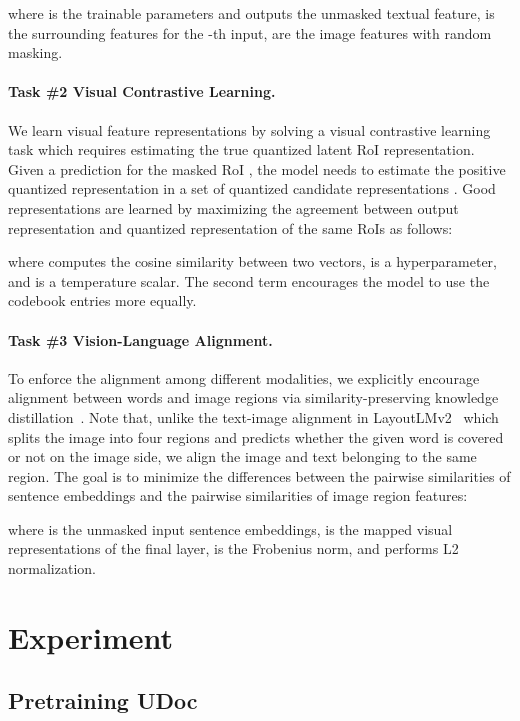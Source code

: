\documentclass{article}
\begin{document}
	{where  is the trainable parameters and  outputs the unmasked textual feature, { is the surrounding features for the -th input},  are the image features with random masking.}
	
	\paragraph{Task \#2 Visual Contrastive Learning.}
	We learn {visual feature} representations by solving a visual contrastive learning task which requires {estimating} the true quantized latent RoI representation. Given {a} {prediction} {} for the masked RoI {}, the model needs to {estimate} the positive quantized representation {} in a set of quantized candidate representations {}.
	{Good representations are learned} by maximizing {the} agreement between output representation and quantized representation {of the same RoIs} as follows:
	
	where  {computes the} cosine similarity between two vectors, {} is a hyperparameter, and  is a temperature scalar. The second term encourages the model to use the codebook entries {more} equally. 
	
	\paragraph{Task \#3 Vision-Language Alignment.}
	To enforce the alignment among different modalities,  we explicitly encourage alignment between words and
	image regions via similarity-preserving knowledge distillation~\cite{tung2019similarity}. Note that, unlike the text-image alignment in LayoutLMv2~\cite{xu2020layoutlmv2} which split{s} the image into four regions and predict{s} whether the {given} word is covered or not on the image side, we align the image {and text belonging} to the same region. The goal is to minimize the {differences between the pairwise similarities of} sentence embeddings and the {pairwise similarities of image region features}:
	
	where { is the unmasked input sentence embeddings,  is the mapped visual representations {of} the final layer,  is the Frobenius norm, and  performs L2 normalization.}
	
	\section{Experiment}
	\subsection{Pretraining UDoc}
\end{document}
